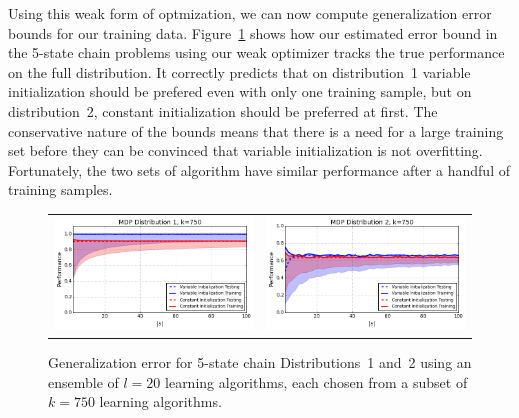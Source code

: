 Using this weak form of optmization, we can now compute generalization error bounds for our training data. Figure~\ref{fig:d1_750} shows how our estimated error bound in the 5-state chain problems using our weak optimizer tracks the true performance on the full distribution. It correctly predicts that on distribution~1 variable initialization should be prefered even with only one training sample, but on distribution~2, constant initialization should be preferred at first. The conservative nature of the bounds means that there is a need for a large training set before they can be convinced that variable initialization is not overfitting. Fortunately, the two sets of algorithm have similar performance after a handful of training samples.
\begin{figure}
\centering
\begin{tabular}{cc}
\includegraphics[width=.4\columnwidth]{images/mdp_distribution1_sampled_rademacher_k_750} &
\includegraphics[width=.4\columnwidth]{images/mdp_distribution2_sampled_rademacher_k_750}
\end{tabular}
\caption{Generalization error for 5-state chain Distributions~1 and~2 using an ensemble of $l=20$ learning algorithms, each chosen from a subset of $k=750$ learning algorithms.}
\label{fig:d1_750}
\end{figure}




{\small

}
